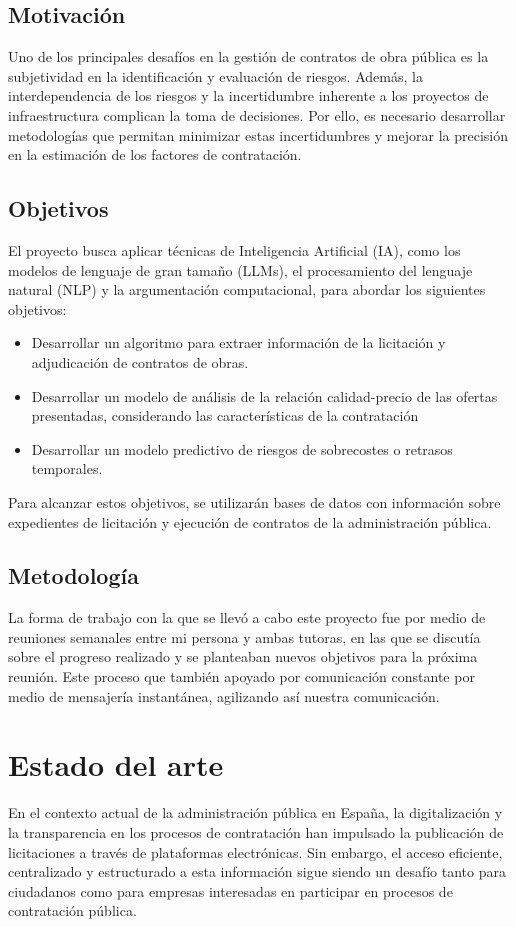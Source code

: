\documentclass{article}
\begin{document}
\subsection{Motivación}
Uno de los principales desafíos en la gestión de contratos de obra pública es la subjetividad en la identificación y evaluación de riesgos. Además, la interdependencia de los riesgos y la incertidumbre inherente a los proyectos de infraestructura complican la toma de decisiones. Por ello, es necesario desarrollar metodologías que permitan minimizar estas incertidumbres y mejorar la precisión en la estimación de los factores de contratación.

\subsection{Objetivos}
El proyecto busca aplicar técnicas de Inteligencia Artificial (IA), como los modelos de lenguaje de gran tamaño (LLMs), el procesamiento del lenguaje natural (NLP) y la argumentación computacional, para abordar los siguientes objetivos:
\begin{itemize}
  \item Desarrollar un algoritmo para extraer información de la licitación y adjudicación de contratos de obras.
  \item Desarrollar un modelo de análisis de la relación calidad-precio de las ofertas presentadas, considerando las características de la contratación
  \item Desarrollar un modelo predictivo de riesgos de sobrecostes o retrasos temporales.
\end{itemize}
Para alcanzar estos objetivos, se utilizarán bases de datos con información sobre expedientes de licitación y ejecución de contratos de la administración pública.

\subsection{Metodología}
La forma de trabajo con la que se llevó a cabo este proyecto fue por medio de reuniones semanales entre mi persona y ambas tutoras, en las que se discutía sobre el progreso realizado y se planteaban nuevos objetivos para la próxima reunión. Este proceso que también apoyado por comunicación constante por medio de mensajería instantánea, agilizando así nuestra comunicación. 
\newpage

\section{Estado del arte}
En el contexto actual de la administración pública en España, la digitalización y la transparencia en los procesos de contratación han impulsado la publicación de licitaciones a través de plataformas electrónicas. Sin embargo, el acceso eficiente, centralizado y estructurado a esta información sigue siendo un desafío tanto para ciudadanos como para empresas interesadas en participar en procesos de contratación pública.
\end{document}
